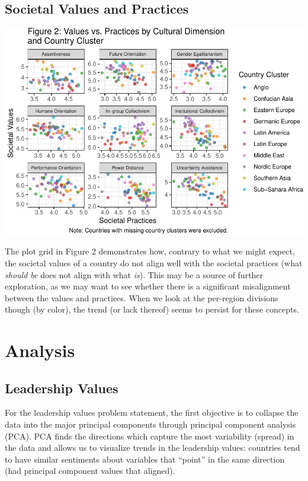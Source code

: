 \documentclass[
]{article}
\begin{document}
\hypertarget{societal-values-and-practices}{%
\subsection{Societal Values and
Practices}\label{societal-values-and-practices}}

\begin{center}\includegraphics[width=0.95\linewidth]{globe_report_files/figure-latex/society-1} \end{center}

The plot grid in Figure 2 demonstrates how, contrary to what we might
expect, the societal values of a country do not align well with the
societal practices (what \emph{should be} does not align with what
\emph{is}). This may be a source of further exploration, as we may want
to see whether there is a significant misalignment between the values
and practices. When we look at the per-region divisions though (by
color), the trend (or lack thereof) seems to persist for these concepts.

\hypertarget{analysis}{%
\section{Analysis}\label{analysis}}

\hypertarget{leadership-values}{%
\subsection{Leadership Values}\label{leadership-values}}

For the leadership values problem statement, the first objective is to
collapse the data into the major principal components through principal
component analysis (PCA). PCA finds the directions which capture the
most variability (spread) in the data and allows us to visualize trends
in the leadership values: countries tend to have similar sentiments
about variables that ``point'' in the same direction (had principal
component values that aligned).
\end{document}

